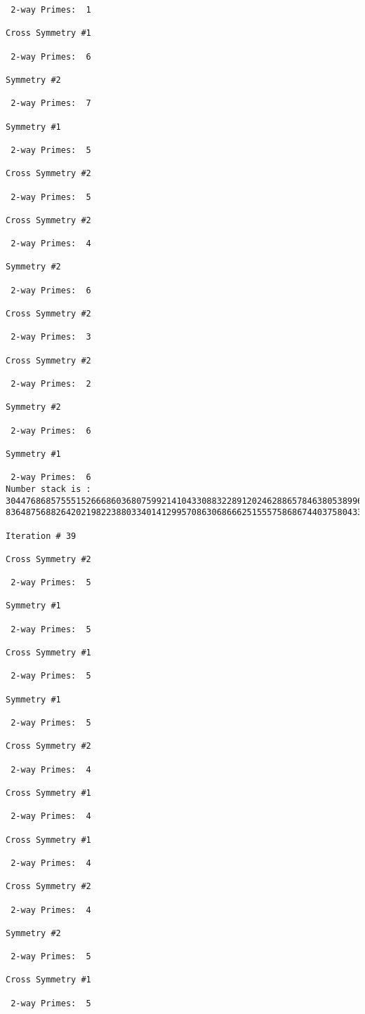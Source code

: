 {{{{\begin{verbatim}
 2-way Primes: 	1

Cross Symmetry #1

 2-way Primes: 	6

Symmetry #2

 2-way Primes: 	7

Symmetry #1

 2-way Primes: 	5

Cross Symmetry #2

 2-way Primes: 	5

Cross Symmetry #2

 2-way Primes: 	4

Symmetry #2

 2-way Primes: 	6

Cross Symmetry #2

 2-way Primes: 	3

Cross Symmetry #2

 2-way Primes: 	2

Symmetry #2

 2-way Primes: 	6

Symmetry #1

 2-way Primes: 	6
Number stack is :
30447686857555152666860368075992141043308832289120246288657846380538996794608835958544046240163340857
83648756882642021982238803340141299570863068666251555758686744037580433610426404458595388064976998350

Iteration #	39

Cross Symmetry #2

 2-way Primes: 	5

Symmetry #1

 2-way Primes: 	5

Cross Symmetry #1

 2-way Primes: 	5

Symmetry #1

 2-way Primes: 	5

Cross Symmetry #2

 2-way Primes: 	4

Cross Symmetry #1

 2-way Primes: 	4

Cross Symmetry #1

 2-way Primes: 	4

Cross Symmetry #2

 2-way Primes: 	4

Symmetry #2

 2-way Primes: 	5

Cross Symmetry #1

 2-way Primes: 	5


\end{verbatim}}}}}
